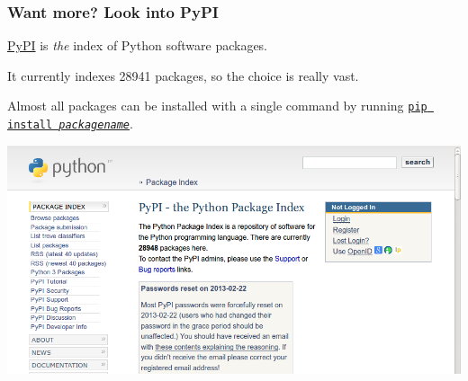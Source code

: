 \documentclass[english,serif,mathserif,xcolor=pdftex,dvipsnames,table]{beamer}
\begin{document}
\begin{frame}
  \frametitle{Want more? Look into PyPI}

  \href{http://pypi.python.org}{PyPI} is \emph{the} index of Python software packages.

  \+ It currently indexes 28941 packages, so the choice is really vast.

  \+ Almost all packages can be installed with a single command by
  running \href{https://pypi.python.org/pypi/pip}{\texttt{pip install
    \emph{packagename}}}.

\includegraphics[width=1\textwidth]{fig/pypi_screenshot.png}
\end{frame}
\end{document}
